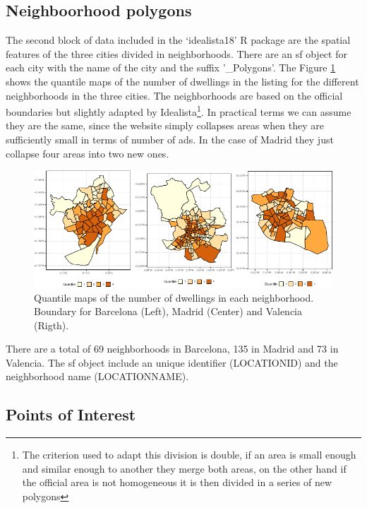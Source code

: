 \documentclass[Royal,times,sageh]{sagej}
\begin{document}
\hypertarget{neighboorhood-polygons}{%
\subsection{Neighboorhood polygons}\label{neighboorhood-polygons}}

The second block of data included in the `idealista18' R package are the
spatial features of the three cities divided in neighborhoods. There are
an sf object for each city with the name of the city and the suffix
'\_Polygons'. The Figure \ref{fig:all-polygons} shows the quantile maps
of the number of dwellings in the listing for the different
neighborhoods in the three cities. The neighborhoods are based on the
official boundaries but slightly adapted by
Idealista\footnote{The criterion used to adapt this division is double, if an area is small enough and similar enough to another they merge both areas, on the other hand if the official area is not homogeneous it is then divided in a series of new polygons}.
In practical terms we can assume they are the same, since the website
simply collapses areas when they are sufficiently small in terms of
number of ads. In the case of Madrid they just collapse four areas into
two new ones.

\begin{figure}
\centering
\includegraphics{EPB_files/figure-latex/unnamed-chunk-1-1.pdf}
\caption{\label{fig:all-polygons}Quantile maps of the number of
dwellings in each neighborhood. Boundary for Barcelona (Left), Madrid
(Center) and Valencia (Rigth).}
\end{figure}

There are a total of 69 neighborhoods in Barcelona, 135 in Madrid and 73
in Valencia. The sf object include an unique identifier (LOCATIONID) and
the neighborhood name (LOCATIONNAME).

\hypertarget{points-of-interest}{%
\subsection{Points of Interest}\label{points-of-interest}}
\end{document}
